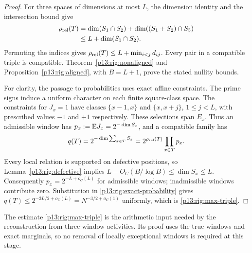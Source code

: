 \begin{proof}
For three spaces of dimensions at most $L$, the dimension
identity and the intersection bound give
\[
 \begin{split}
 \rho_{\rm rel}(T)
 &=\dim(S_1\cap S_2)+\dim((S_1+S_2)\cap S_3)\\
 &\le L+\dim(S_1\cap S_2).
 \end{split}
\]
Permuting the indices gives
$\rho_{\rm rel}(T)\le L+\min_{i<j}d_{ij}$.
Every pair in a compatible triple is compatible.
Theorem~\ref{p13:rig:nonaligned} and
Proposition~\ref{p13:rig:aligned}, with $B=L+1$, prove
the stated nullity bounds.

For clarity, the passage to probabilities uses exact
affine constraints.  The prime signs induce a uniform
character on each finite square-class space.  The
constraints for $J_x=1$ have classes
$\{x-1,x\}$ and $\{x,x+j\}$, $1\le j<L$, with prescribed
values $-1$ and $+1$ respectively.  These selections span
$E_x$.  Thus an admissible window has
$p_x:=\mathbb E J_x=2^{-\dim S_x}$, and a compatible family has
\begin{equation}
 q(T)=2^{-\dim\sum_{x\in T}S_x}
                  =2^{\rho_{\rm rel}(T)}\prod_{x\in T}p_x.
 \label{p13:rig:exact-probability}
\end{equation}
Every local relation is supported on defective positions,
so Lemma~\ref{p13:rig:defective} implies
$L-O_C(B/\log B)\le\dim S_x\le L$.
Consequently $p_x=2^{-L+o_C(L)}$ for admissible windows;
inadmissible windows contribute zero.  Substitution in
\eqref{p13:rig:exact-probability} gives
$q(T)\le2^{-3L/2+o_C(L)}=N^{-3/2+o_C(1)}$ uniformly,
which is \eqref{p13:rig:max-triple}.
\end{proof}

The estimate \eqref{p13:rig:max-triple} is the arithmetic
input needed by the reconstruction from three-window
activities.  Its proof uses the true windows and exact
marginals, so no removal of locally exceptional windows
is required at this stage.
